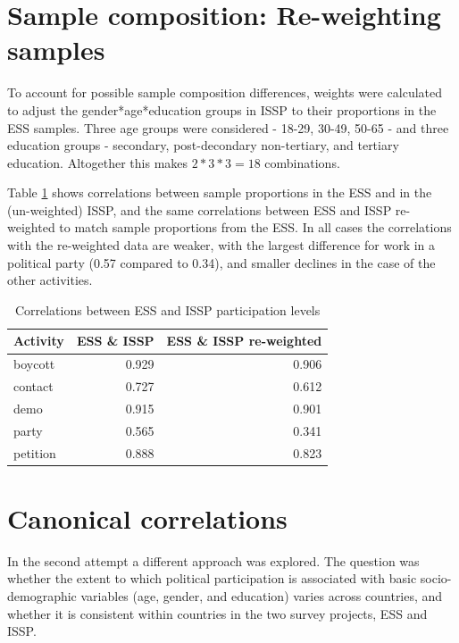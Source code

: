 \documentclass[12pt,]{article}
\begin{document}
\hypertarget{sample-composition-re-weighting-samples}{%
\section{Sample composition: Re-weighting samples}\label{sample-composition-re-weighting-samples}}

To account for possible sample composition differences, weights were calculated to adjust the gender*age*education groups in ISSP to their proportions in the ESS samples. Three age groups were considered - 18-29, 30-49, 50-65 - and three education groups - secondary, post-decondary non-tertiary, and tertiary education. Altogether this makes \(2*3*3=18\) combinations.

Table \ref{tab:sample-re-weighting} shows correlations between sample proportions in the ESS and in the (un-weighted) ISSP, and the same correlations between ESS and ISSP re-weighted to match sample proportions from the ESS. In all cases the correlations with the re-weighted data are weaker, with the largest difference for work in a political party (0.57 compared to 0.34), and smaller declines in the case of the other activities.

\begin{table}[t]

\caption{\label{tab:sample-re-weighting}Correlations between ESS and ISSP participation levels}
\centering
\fontsize{11}{13}\selectfont
\begin{tabular}{lrr}
\toprule
Activity & ESS \& ISSP & ESS \& ISSP re-weighted\\
\midrule
\rowcolor{gray!6}  boycott & 0.929 & 0.906\\
contact & 0.727 & 0.612\\
\rowcolor{gray!6}  demo & 0.915 & 0.901\\
party & 0.565 & 0.341\\
\rowcolor{gray!6}  petition & 0.888 & 0.823\\
\bottomrule
\end{tabular}
\end{table}

\hypertarget{canonical-correlations}{%
\section{Canonical correlations}\label{canonical-correlations}}

In the second attempt a different approach was explored. The question was whether the extent to which political participation is associated with basic socio-demographic variables (age, gender, and education) varies across countries, and whether it is consistent within countries in the two survey projects, ESS and ISSP.
\end{document}
